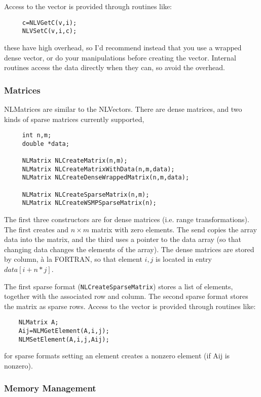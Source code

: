 \documentclass[12pt]{article}
\begin{document}
   Access to the vector is provided through routines like:
   \begin{verbatim}
     c=NLVGetC(v,i);
     NLVSetC(v,i,c);
   \end{verbatim}
   these have high overhead, so I'd recommend instead that you use a wrapped dense vector, or do your manipulations
   before creating the vector. Internal routines access the data directly when they can, so avoid the overhead.

   \subsubsection{Matrices}

    NLMatrices are similar to the NLVectors. There are dense matrices, and two kinds of sparse matrices currently supported,
   \begin{verbatim}
     int n,m;
     double *data;

     NLMatrix NLCreateMatrix(n,m);
     NLMatrix NLCreateMatrixWithData(n,m,data);
     NLMatrix NLCreateDenseWrappedMatrix(n,m,data);

     NLMatrix NLCreateSparseMatrix(n,m);
     NLMatrix NLCreateWSMPSparseMatrix(n);
   \end{verbatim}
   The first three constructors are for dense matrices (i.e. range transformations). The first creates and $n\times m$
   matrix with zero elements. The send copies the array data into the matrix, and the third uses a pointer to the
   data array (so that changing data changes the elements of the array). The dense matrices are stored by column,
   \`a la FORTRAN, so that element $i,j$ is located in entry $data[i+n*j]$.

   The first sparse format ({\tt NLCreateSparseMatrix}) stores a list of elements, together with the associated
   row and column. The second sparse format stores the matrix as sparse rows. 
   Access to the vector is provided through routines like:
   \begin{verbatim}
    NLMatrix A;
    Aij=NLMGetElement(A,i,j);
    NLMSetElement(A,i,j,Aij);
   \end{verbatim}
   for sparse formats setting an element creates a nonzero element (if Aij is nonzero).

   \subsubsection{Memory Management}
\end{document}
